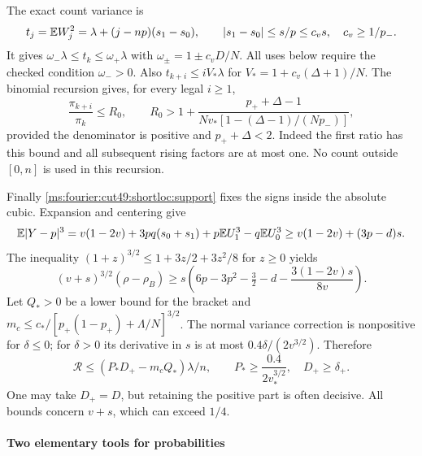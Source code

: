 The exact count variance is
\begin{equation}\label{ms:fourier:cut49:shortloc:variance}
 t_j=\mathbb E W_j^2=\lambda+(j-np)(s_1-s_0),\qquad
 |s_1-s_0|\le s/p\le c_v s,\quad c_v\ge1/p_-.
\end{equation}
It gives $\omega_-\lambda\le t_k\le\omega_+\lambda$ with
$\omega_\pm=1\pm c_vD/N$. All uses below require the checked condition
$\omega_->0$. Also
$t_{k+i}\le iV_*\lambda$ for $V_*=1+c_v(\Delta+1)/N$.
The binomial recursion gives, for every legal $i\ge1$,
\begin{equation}\label{ms:fourier:cut49:shortloc:ratio}
 \frac{\pi_{k+i}}{\pi_k}\le R_0,
 \qquad R_0>1+\frac{p_++\Delta-1}
 {Nv_*[1-(\Delta-1)/(Np_-)]},
\end{equation}
provided the denominator is positive and $p_++\Delta<2$.
Indeed the first ratio has this bound and all subsequent rising factors
are at most one. No count outside $[0,n]$ is used in this recursion.

Finally \eqref{ms:fourier:cut49:shortloc:support} fixes the signs inside the absolute cubic.
Expansion and centering give
\[
 \mathbb E|Y-p|^3=v(1-2v)+3pq(s_0+s_1)
                   +p\mathbb E U_1^3-q\mathbb E U_0^3
 \ge v(1-2v)+(3p-d)s.
\]
The inequality $(1+z)^{3/2}\le1+3z/2+3z^2/8$ for $z\ge0$ yields
\begin{equation}\label{ms:fourier:cut49:shortloc:cubic}
 (v+s)^{3/2}(\rho-\rho_B)\ge s
     \left(6p-3p^2-\tfrac32-d-\frac{3(1-2v)s}{8v}\right).
\end{equation}
Let $Q_*>0$ be a lower bound for the bracket and
$m_c\le c_*/[p_+(1-p_+)+\Lambda/N]^{3/2}$.
The normal variance correction is nonpositive for $\delta\le0$;
for $\delta>0$ its derivative in $s$ is at most $0.4\delta/(2v^{3/2})$.
Therefore
\begin{equation}\label{ms:fourier:cut49:shortloc:repair}
 \mathcal R\le(P_*D_+-m_cQ_*)\lambda/n,
 \qquad P_*\ge\frac{0.4}{2v_*^{3/2}},\quad D_+\ge\delta_+.
\end{equation}
One may take $D_+=D$, but retaining the positive part is often decisive.
All bounds concern $v+s$, which can exceed $1/4$.

\paragraph{Two elementary tools for probabilities}


